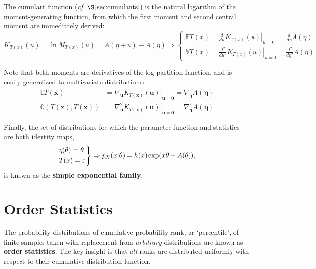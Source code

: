\documentclass[12pt, twoside, draft]{article}
\begin{document}
The cumulant function (\textit{cf. }$\S$\ref{sec:cumulants}) is the natural logarithm of the moment-generating function, from which the first moment and second central moment are immediately derived:
\begin{equation}
K_{T(x)}(u) = \ln M_{T(x)}(u) = A(\eta + u) - A(\eta) \Rightarrow
\begin{cases}
\mathbb{E}T(x) = \frac{d}{du} \left. K_{T(x)}(u) \right|_{u=0} \hspace{4pt} = \frac{d}{d \eta} A(\eta) \\
\mathbb{V}T(x) = \frac{d^2}{du^2} \left. K_{T(x)}(u) \right|_{u=0} = \frac{d^2}{d \eta^2} A(\eta)
\end{cases}
\end{equation}

Note that both moments are derivatives of the log-partition function, and is easily generalized to multivariate distributions:
\begin{align}
\mathbb{E}T(\mathbf{x}) &= \nabla_{\mathbf{u}} \left. K_{T(\mathbf{x})}(\mathbf{u}) \right|_{\mathbf{u}=\mathbf{0}} = \nabla_{\boldsymbol{\eta}} A(\boldsymbol{\eta}) \\
\mathbb{C}(T(\mathbf{x}), T(\mathbf{x})) &= \nabla_{\mathbf{u}}^2 \left. K_{T(\mathbf{x})}(\mathbf{u}) \right|_{\mathbf{u}=\mathbf{0}} = \nabla_{\boldsymbol{\eta}}^2 A(\boldsymbol{\eta})
\end{align}

Finally, the set of distributions for which the parameter function and statistics are both identity maps,
\begin{equation}
\begin{rcases}
\eta(\theta) = \theta \\
T(x) = x
\end{rcases} \Rightarrow
p_X(x|\theta) = h(x) \exp(x\theta - A(\theta)),
\end{equation}
is known as the \textbf{simple exponential family}.

\section{Order Statistics}\label{sec:order_statistics}
The probability distributions of cumulative probability rank, or `percentile', of finite samples taken with replacement from \textit{arbitrary} distributions are known as \textbf{order statistics}.  The key insight is that \textit{all} ranks are distributed uniformly with respect to their cumulative distribution function.
\end{document}
